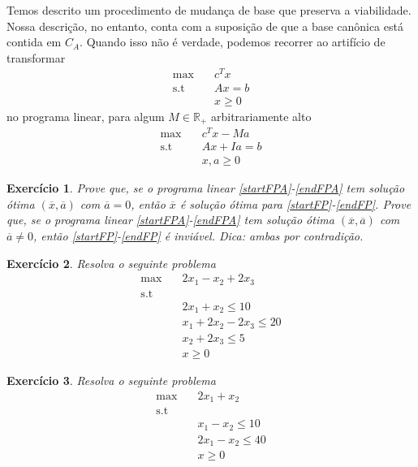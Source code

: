 \documentclass[]{article}
\newtheorem{exercicio}{Exercício}
\numberwithin{equation}{section}
\begin{document}
Temos descrito um procedimento de mudança de base que preserva a viabilidade.
Nossa descrição, no entanto, conta com a suposição de que a base canônica está contida em $C_A$.
Quando isso não é verdade, podemos recorrer ao artifício de transformar
\begin{align}
\max        &\quad  c^Tx \label{startFP} \\
\text{s.t}  &\quad  Ax = b \\
            &\quad  x \geq 0 \label{endFP}
\end{align}
no programa linear, para algum $M \in \mathbb{R}_+$ arbitrariamente alto
\begin{align}
\max        &\quad  c^Tx - Ma \label{startFPA} \\
\text{s.t}  &\quad  Ax + Ia = b \\
            &\quad  x, a \geq 0 \label{endFPA}
\end{align}

\begin{exercicio}
  Prove que, se o programa linear \eqref{startFPA}-\eqref{endFPA} tem solução ótima $(\overline{x}, \overline{a})$ com $\overline{a} = 0$, então $\overline{x}$ é solução ótima para \eqref{startFP}-\eqref{endFP}.
  Prove que, se o programa linear \eqref{startFPA}-\eqref{endFPA} tem solução ótima $(\overline{x}, \overline{a})$ com $\overline{a} \neq 0$, então \eqref{startFP}-\eqref{endFP} é inviável.
  Dica: ambas por contradição.
\end{exercicio}

\begin{exercicio}
  Resolva o seguinte problema
  \begin{align}
  \max        &\quad 2x_1 -  x_2 + 2x_3         \\
  \text{s.t}  &\quad                            \\
              &\quad 2x_1 +  x_2        \leq 10 \\
              &\quad  x_1 + 2x_2 - 2x_3 \leq 20 \\
              &\quad         x_2 + 2x_3 \leq 5  \\
              &\quad x                  \geq 0
  \end{align}
\end{exercicio}

\begin{exercicio}
  Resolva o seguinte problema
  \begin{align}
  \max        &\quad 2x_1 +  x_2         \\
  \text{s.t}  &\quad                     \\
              &\quad  x_1 -  x_2 \leq 10 \\
              &\quad 2x_1 -  x_2 \leq 40 \\
              &\quad x           \geq 0
  \end{align}
\end{exercicio}
\end{document}
